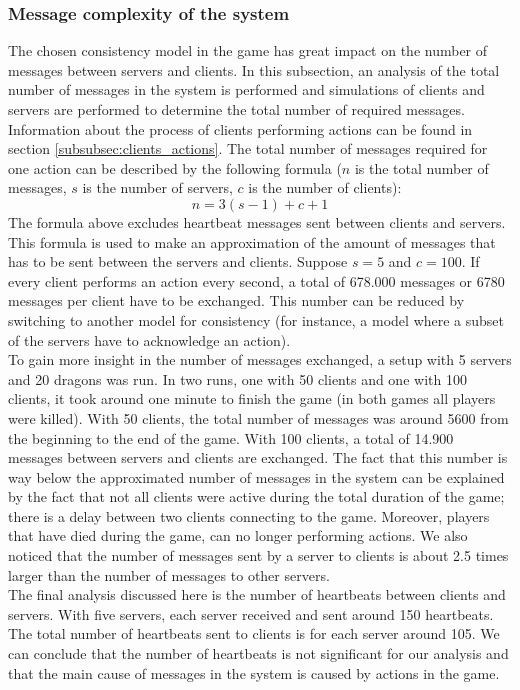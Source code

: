 	\subsubsection{Message complexity of the system}
	\label{subsubsec:nummessages}
		The chosen consistency model in the game has great impact on the number of messages between servers and clients. 
		In this subsection, an analysis of the total number of messages in the system is performed and simulations of clients and servers are performed to determine the total number of required messages.\\
		
		Information about the process of clients performing actions can be found in section \ref{subsubsec:clients_actions}. 
		The total number of messages required for one action can be described by the following formula ($ n $ is the total number of messages, $ s $ is the number of servers, $ c $ is the number of clients):
		$$ n = 3(s - 1) + c + 1 $$
		The formula above excludes heartbeat messages sent between clients and servers.
		This formula is used to make an approximation of the amount of messages that has to be sent between the servers and clients. 
		Suppose $ s = 5 $ and $ c = 100 $. 
		If every client performs an action every second, a total of 678.000 messages or 6780 messages per client have to be exchanged. 
		This number can be reduced by switching to another model for consistency (for instance, a model where a subset of the servers have to acknowledge an action).\\
		To gain more insight in the number of messages exchanged, a setup with 5 servers and 20 dragons was run. 
		In two runs, one with 50 clients and one with 100 clients, it took around one minute to finish the game (in both games all players were killed). 
		With 50 clients, the total number of messages was around 5600 from the beginning to the end of the game. 
		With 100 clients, a total of 14.900 messages between servers and clients are exchanged. 
		The fact that this number is way below the approximated number of messages in the system can be explained by the fact that not all clients were active during the total duration of the game; there is a delay between two clients connecting to the game. 
		Moreover, players that have died during the game, can no longer performing actions. We also noticed that the number of messages sent by a server to clients is about 2.5 times larger than the number of messages to other servers.\\
		The final analysis discussed here is the number of heartbeats between clients and servers. 
		With five servers, each server received and sent around 150 heartbeats. 
		The total number of heartbeats sent to clients is for each server around 105. 
		We can conclude that the number of heartbeats is not significant for our analysis and that the main cause of messages in the system is caused by actions in the game.

